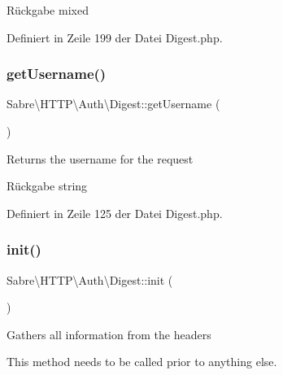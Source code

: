 \begin{DoxyReturn}{Rückgabe}
mixed 
\end{DoxyReturn}


Definiert in Zeile 199 der Datei Digest.\+php.

\mbox{\label{class_sabre_1_1_h_t_t_p_1_1_auth_1_1_digest_aac357fbd44dec1343d672e2514af677d}} 
\subsubsection{\texorpdfstring{get\+Username()}{getUsername()}}
{\footnotesize\ttfamily Sabre\textbackslash{}\+H\+T\+T\+P\textbackslash{}\+Auth\textbackslash{}\+Digest\+::get\+Username (\begin{DoxyParamCaption}{ }\end{DoxyParamCaption})}

Returns the username for the request

\begin{DoxyReturn}{Rückgabe}
string 
\end{DoxyReturn}


Definiert in Zeile 125 der Datei Digest.\+php.

\mbox{\label{class_sabre_1_1_h_t_t_p_1_1_auth_1_1_digest_ab728a5988c652dadc47058f99eccaefd}} 
\subsubsection{\texorpdfstring{init()}{init()}}
{\footnotesize\ttfamily Sabre\textbackslash{}\+H\+T\+T\+P\textbackslash{}\+Auth\textbackslash{}\+Digest\+::init (\begin{DoxyParamCaption}{ }\end{DoxyParamCaption})}

Gathers all information from the headers

This method needs to be called prior to anything else.

